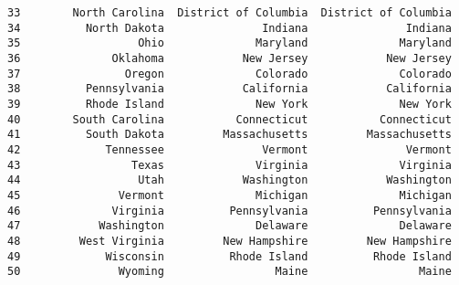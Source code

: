 \documentclass[11pt]{article}
\begin{document}
\begin{Verbatim}[commandchars=\\\{\}]
33        North Carolina  District of Columbia  District of Columbia   
34          North Dakota               Indiana               Indiana   
35                  Ohio              Maryland              Maryland   
36              Oklahoma            New Jersey            New Jersey   
37                Oregon              Colorado              Colorado   
38          Pennsylvania            California            California   
39          Rhode Island              New York              New York   
40        South Carolina           Connecticut           Connecticut   
41          South Dakota         Massachusetts         Massachusetts   
42             Tennessee               Vermont               Vermont   
43                 Texas              Virginia              Virginia   
44                  Utah            Washington            Washington   
45               Vermont              Michigan              Michigan   
46              Virginia          Pennsylvania          Pennsylvania   
47            Washington              Delaware              Delaware   
48         West Virginia         New Hampshire         New Hampshire   
49             Wisconsin          Rhode Island          Rhode Island   
50               Wyoming                 Maine                 Maine   


\end{Verbatim}
\end{document}

